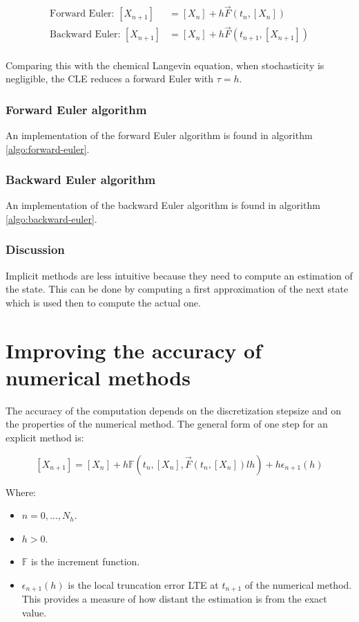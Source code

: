   \begin{align*}
    \text{Forward Euler: } [X_{n+1}] &= [X_n] + h\vec{F}(t_n, [X_n])\\
    \text{Backward Euler: } [X_{n+1}] &= [X_n] + h\vec{F}(t_{n+1}, [X_{n+1}])\\
  \end{align*}

  Comparing this with the chemical Langevin equation, when stochasticity is negligible, the CLE reduces a forward Euler with $\tau=h$.

    \subsubsection{Forward Euler algorithm}
    An implementation of the forward Euler algorithm is found in algorithm \ref{algo:forward-euler}.

    

    \subsubsection{Backward Euler algorithm}
    An implementation of the backward Euler algorithm is found in algorithm \ref{algo:backward-euler}.

    

    \subsubsection{Discussion}
    Implicit methods are less intuitive because they need to compute an estimation of the state.
    This can be done by computing a first approximation of the next state which is used then to compute the actual one.



\section{Improving the accuracy of numerical methods}
The accuracy of the computation depends on the discretization stepsize and on the properties of the numerical method.
The general form of one step for an explicit method is:

$$[X_{n+1}] = [X_n] +h\mathbb{F}(t_n, [X_n], \vec{F}(t_n, [X_n])lh) + h\epsilon_{n+1}(h)$$

Where:

\begin{multicols}{2}
  \begin{itemize}
    \item $n = 0, \dots, N_h$.
    \item $h>0$.
    \item $\mathbb{F}$ is the increment function.
    \item $\epsilon_{n+1}(h)$ is the local truncation error LTE at $t_{n+1}$ of the numerical method.
      This provides a measure of how distant the estimation is from the exact value.
  \end{itemize}
\end{multicols}

